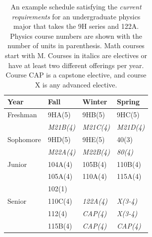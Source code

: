 \documentclass[12pt]{article}
\begin{document}
\begin{table}[thbp]
\caption{\label{tbl:current-honors} An example schedule
  satisfying the {\em current requirements} for an undergraduate
  physics major that takes the 9H series and 122A. Physics course
  numbers are shown with the number of units in parenthesis.  Math
  courses start with M.  Courses in italics are electives or have at
  least two different offerings per year. Course CAP is a capstone
  elective, and course X is any advanced elective.}
\begin{center}
\begin{tabular}{|l|l|l|l|}
\hline
Year      & Fall    & Winter & Spring \\
\hline
Freshman  & 9HA(5)     & 9HB(5)     & 9HC(5) \\
          & {\it M21B(4)}  & {\it M21C(4)}  & {\it M21D(4)} \\
\hline
Sophomore & 9HD(5)     & 9HE(5)     & 40(3)     \\
          & {\it M22A(4)}     & {\it M22B(4)} & {\it 80(4)} \\
\hline
Junior    & 104A(4) & 105B(4) & 110B(4)\\
          & 105A(4) & 110A(4) & 115A(4)\\
          & 102(1)  &    &     \\
\hline
Senior    & 110C(4) & {\it 122A(4)} & {\it X(3-4)}\\
          & 112(4)  & {\it CAP(4)}   & {\it X(3-4)}\\
          & 115B(4) & {\it CAP(4)}   & {\it CAP(4)}\\

\hline 
\end{tabular}
\end{center}
\end{table}
\end{document}

